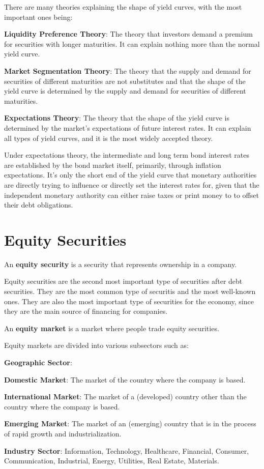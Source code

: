 
There are many theories explaining the shape of yield curves, with the most important ones being:
\bit
\item \textbf{Liquidity Preference Theory}: The theory that investors demand a premium for securities with longer
maturities. It can explain nothing more than the normal yield curve.
\item \textbf{Market Segmentation Theory}: The theory that the supply and demand for securities of different maturities
are not substitutes and that the shape of the yield curve is determined by the supply and demand for securities of
different maturities.
\item \textbf{Expectations Theory}: The theory that the shape of the yield curve is determined by the market's
expectations of future interest rates. It can explain all types of yield curves, and it is the most widely accepted
theory.
\eit

Under expectations theory, the intermediate and long term bond interest rates are established by the bond market
itself, primarily, through inflation expectations. It's only the short end of the yield curve that monetary authorities
are directly trying to influence or directly set the interest rates for, given that the independent monetary authority
can either raise taxes or print money to to offset their debt obligations.


\newpage

\section{Equity Securities}

An \textbf{equity security} is a security that represents ownership in a company.
\ed

Equity securities are the second most important type of securities after debt securities. They are the most common
type of securitis and the most well-known ones. They are also the most important type of securities for the economy,
since they are the main source of financing for companies.

An \textbf{equity market} is a market where people trade equity securities.
\ed

Equity markets are divided into various subsectors such as:
\bit
\item \textbf{Geographic Sector}:
\bit
\item \textbf{Domestic Market}: The market of the country where the company is based.
\item \textbf{International Market}: The market of a (developed) country other than the country where the company is
based.
\item \textbf{Emerging Market}: The market of an (emerging) country that is in the process of rapid growth and
industrialization.
\eit
\item \textbf{Industry Sector}: Information, Technology, Healthcare, Financial, Consumer, Communication, Industrial,
Energy, Utilities, Real Estate, Materials.
\eit

